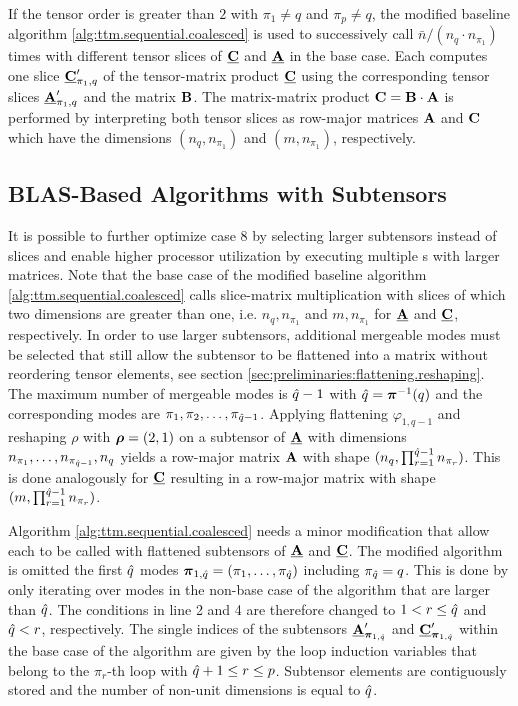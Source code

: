 If the tensor order is greater than $2$ with $\pi_1\neq q$ and $\pi_p \neq q$, the modified baseline algorithm \ref{alg:ttm.sequential.coalesced} is used to successively call $\bar{n} / (n_q \cdot n_{\pi_1})$ times  with different tensor slices of $\underline{\mathbf{C}}$ and $\underline{\mathbf{A}}$ in the base case.
Each  computes one slice $\underline{\mathbf{C}}_{\pi_1,q}'$ of the tensor-matrix product $\underline{\mathbf{C}}$ using the corresponding tensor slices $\underline{\mathbf{A}}_{\pi_1,q}'$ and the matrix $\mathbf{B}$.
The matrix-matrix product $\mathbf{C} = \mathbf{B} \cdot \mathbf{A}$ is performed by interpreting both tensor slices as row-major matrices $\mathbf{A}$ and $\mathbf{C}$ which have the dimensions $(n_q,n_{\pi_1})$ and $(m,n_{\pi_1})$, respectively.

\subsection{BLAS-Based Algorithms with Subtensors}
\label{sec:design:blas.based.algorithm}
It is possible to further optimize case 8 by selecting larger subtensors instead of slices and enable higher processor utilization by executing multiple s with larger matrices.
Note that the base case of the modified baseline algorithm \ref{alg:ttm.sequential.coalesced} calls slice-matrix multiplication with slices of which two dimensions are greater than one, i.e. $n_q,n_{\pi_1}$ and $m,n_{\pi_1}$ for $\underline{\mathbf{A}}$ and $\underline{\mathbf{C}}$, respectively.
In order to use larger subtensors, additional mergeable modes must be selected that still allow the subtensor to be flattened into a matrix without reordering tensor elements, see section \ref{sec:preliminaries:flattening.reshaping}.
The maximum number of mergeable modes is $\hat{q}-1$ with $\hat{q} = \boldsymbol{\pi}^{-1}(q)$ and the corresponding modes are $\pi_1,\pi_2,\dots,\pi_{\hat{q}-1}$.
Applying flattening $\varphi_{1,q-1}$ and reshaping $\rho$ with $\boldsymbol{\rho} = (2,1)$ on a subtensor of $\underline{\mathbf{A}}$ with dimensions $n_{\pi_1},\dots,n_{\pi_{\hat{q}-1}}, n_{q}$ yields a row-major matrix $\mathbf{A}$ with shape $(n_q,\prod_{r=1}^{\hat{q}-1} n_{\pi_r})$.
This is done analogously for $\underline{\mathbf{C}}$ resulting in a row-major matrix with shape $(m, \prod_{r=1}^{\hat{q}-1} n_{\pi_r})$.

Algorithm \ref{alg:ttm.sequential.coalesced} needs a minor modification that allow each  to be called with flattened subtensors of $\underline{\mathbf{A}}$ and $\underline{\mathbf{C}}$. 
The modified algorithm is omitted the first $\hat{q}$ modes $\boldsymbol{\pi}_{1,\hat{q}} = (\pi_1, \dots, \pi_{\hat{q}})$ including $\pi_{\hat{q}} = q$.
This is done by only iterating over modes in the non-base case of the algorithm that are larger than $\hat{q}$.
The conditions in line 2 and 4 are therefore changed to $1 < r \leq \hat{q}$ and $\hat{q} < r$, respectively.
The single indices of the subtensors $\underline{\mathbf{A}}_{\boldsymbol{\pi}_{1,\hat{q}}}'$ and $\underline{\mathbf{C}}_{\boldsymbol{\pi}_{1,\hat{q}}}'$ within the base case of the algorithm are given by the loop induction variables that belong to the $\pi_r$-th loop with $\hat{q}+1 \leq r \leq p$.  %
Subtensor elements are contiguously stored and the number of non-unit dimensions is equal to $\hat{q}$.

